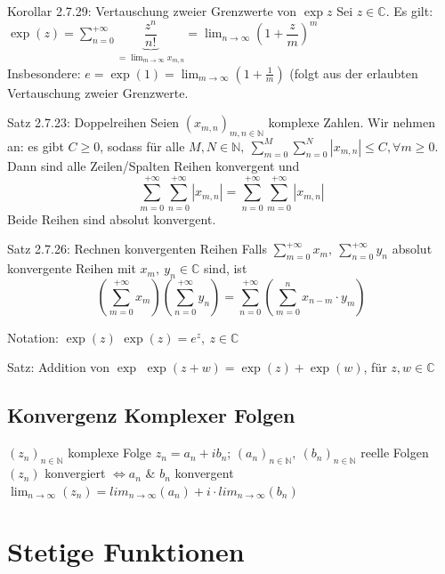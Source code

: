 \documentclass[a4paper,10pt]{article}
\begin{document}
\begin{tbox}
    {Korollar 2.7.29:  Vertauschung zweier Grenzwerte von $\exp{z}$}
    Sei $z\in\mathbb C$. Es gilt: $\exp{(z)}=\sum_{n=0}^{+\infty}\underbrace{\dfrac{z^n}{n!}}_{=\lim_{m\to\infty}x_{m,n}}=\lim_{n\to\infty}(1+\dfrac z m )^m$\\
    Insbesondere: $e=\exp{(1)}=\lim_{m\to\infty}(1+\frac 1 m)$ (folgt aus der erlaubten Vertauschung zweier Grenzwerte.
\end{tbox}

\begin{tbox}
    {Satz 2.7.23: Doppelreihen}
    Seien $(x_{m,n})_{m,n\in\mathbb N}$ komplexe Zahlen. Wir nehmen an: es gibt $C\ge0$, sodass für alle $M,N\in \mathbb N,\ \sum^M_{m=0}\sum_{n=0}^N|x_{m,n}|\le C, \forall m \ge 0$. Dann sind alle Zeilen/Spalten Reihen konvergent und $$\sum^{+\infty}_{m=0}\sum_{n=0}^{+\infty}|x_{m,n}|=\sum^{+\infty}_{n=0}\sum_{m=0}^{+\infty}|x_{m,n}|$$
    Beide Reihen sind absolut konvergent.
\end{tbox}
\begin{tbox}
    {Satz 2.7.26: Rechnen konvergenten Reihen}
    Falls $\sum_{m=0}^{+\infty}x_m,\ \sum_{n=0}^{+\infty}y_n$ absolut konvergente Reihen mit $x_m,\ y_n\in \mathbb C$ sind, ist $$(\displaystyle\sum_{m=0}^{+\infty}x_m)(\displaystyle\sum_{n=0}^{+\infty}y_n)= \displaystyle\sum_{n=0}^{+\infty}(\displaystyle\sum_{m=0}^{n}x_{n-m}\cdot y_m)$$
\end{tbox}
\begin{bembox}
    {Notation: $\exp{(z)}$}
    $\exp{(z)}=e^z,\ z\in \mathbb C$
\end{bembox}
\begin{tbox}
    {Satz: Addition von $\exp$}
    $\exp(z+w)=\exp(z)+\exp(w)$, für $z,w\in \mathbb C$
\end{tbox}
\subsection{Konvergenz Komplexer Folgen}
    $(z_n)_{n\in\mathbb N}$ komplexe Folge $z_n=a_n+ib_n$; $(a_n)_{n\in\mathbb N},\ (b_n)_{n\in\mathbb N}$ reelle Folgen
    \\$(z_n)$ konvergiert $\iff a_n$ \& $b_n$ konvergent
    \\$\lim_{n\rightarrow\infty}(z_n)=lim_{n\rightarrow\infty}(a_n)+i\cdot lim_{n\rightarrow\infty}(b_n)$
\section{Stetige Funktionen}
\end{document}
